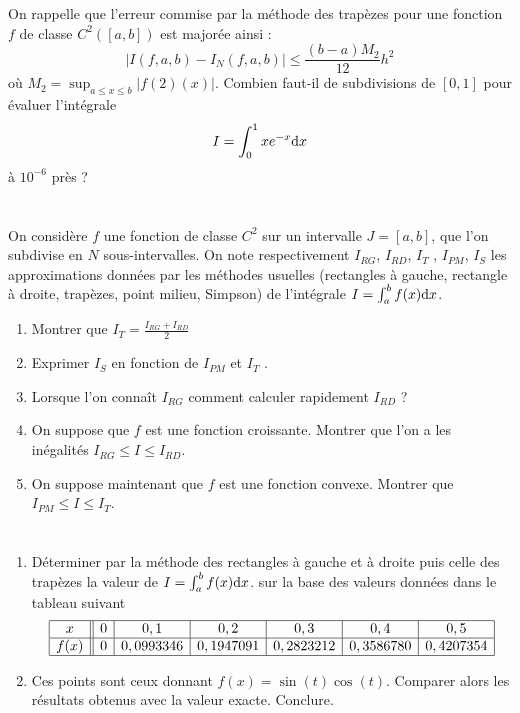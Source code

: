 \documentclass[a4paper]{article}
\def \de {{\rm d}}
\begin{document}
 \section{} 
On rappelle que l'erreur commise par la méthode des trapèzes pour une fonction $f$
de classe $C^2([a, b])$ est majorée ainsi :
\[
|I(f, a, b) - I_N(f, a, b)| \leq \frac{(b-a)M_2}{12}h^2\]
où $M_2 =\displaystyle \sup_{a\leq x\leq b}|f(2)(x)|$. Combien faut-il de subdivisions de $[0, 1]$ pour évaluer l'intégrale
\[I =\int_0^1 xe^{-x}\de x\]
à $10^{-6}$ près ?


\section{} 
 On considère $f$ une fonction de classe $C^2$ sur un intervalle $J = [a, b]$, que l'on
subdivise en $N$ sous-intervalles.
On note respectivement $I_{RG}$, $I_{RD}$, $I_T$ , $I_{PM}$, $I_S$ les approximations données par les méthodes usuelles
(rectangles à gauche, rectangle à droite, trapèzes, point milieu, Simpson) de l'intégrale $I = \int_a^bf(x)\de x$.
\begin{enumerate}
\item Montrer que $I_T =\frac{I_{RG}+I_{RD}}2$
\item  Exprimer $I_S$ en fonction de $I_{PM}$ et $I_T$ .
\item Lorsque l'on connaît $I_{RG}$ comment calculer rapidement $I_{RD}$ ?
\item On suppose que $f$ est une fonction croissante. Montrer que l'on a les inégalités
$I_{RG} \leq I \leq I_{RD}$.
\item On suppose maintenant que $f$ est une fonction convexe. Montrer que $I_{PM} \leq I \leq I_T$.

\end{enumerate}

\section{} 
 \begin{enumerate}
\item Déterminer par la méthode des rectangles à gauche et à droite puis celle des trapèzes la valeur de $I = \int_a^bf(x)\de x$.
sur la base des valeurs données dans le tableau suivant
\[
\begin{array}{|c||c|c|c|c|c|c|}\hline
x & 0 & 0,1 & 0,2 &0,3 &0,4 &0,5\\ \hline
f(x)&0 &0,0993346 &0,1947091 &0,2823212 &0,3586780 &0,4207354\\ \hline
\end{array}
\]

\item Ces points sont ceux donnant $f(x) = \sin (t) \cos (t)$. Comparer alors les résultats obtenus avec la valeur exacte. Conclure.
\end{enumerate} 
\end{document}
